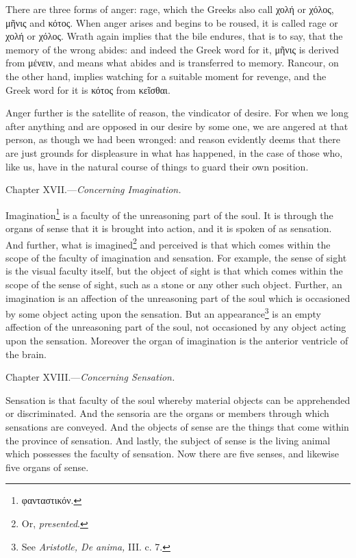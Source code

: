 There are three forms of anger: rage, which the Greeks also call \textgreek{χολή} or \textgreek{χόλος}, \textgreek{μῆνις} and \textgreek{κότος}. When anger arises and begins to be roused, it is called rage or \textgreek{χολή} or \textgreek{χόλος}. Wrath again implies that the bile endures, that is to say, that the memory of the wrong abides: and indeed the Greek word for it, \textgreek{μῆνις} is derived from \textgreek{μένειν}, and means what abides and is transferred to memory. Rancour, on the other hand, implies watching for a suitable moment for revenge, and the Greek word for it is \textgreek{κότος} from \textgreek{κεῖσθαι}.

Anger further is the satellite of reason, the vindicator of desire. For when we long after anything and are opposed in our desire by some one, we are angered at that person, as though we had been wronged: and reason evidently deems that there are just grounds for displeasure in what has happened, in the case of those who, like us, have in the natural course of things to guard their own position.


Chapter XVII.—\emph{Concerning Imagination.}

Imagination\footnote{\textgreek{φανταστικόν}.} is a faculty of the unreasoning part of the soul. It is through the organs of sense that it is brought into action, and it is spoken of as sensation. And further, what is imagined\footnote{Or, \emph{presented}.} and perceived is that which comes within the scope of the faculty of imagination and sensation. For example, the sense of sight is the visual faculty itself, but the object of sight is that which comes within the scope of the sense of sight, such as a stone or any other such object. Further, an imagination is an affection of the unreasoning part of the soul which is occasioned by some object acting upon the sensation. But an appearance\footnote{See \emph{Aristotle, De anima, }III. c. 7.} is an empty affection of the unreasoning part of the soul, not occasioned by any object acting upon the sensation. Moreover the organ of imagination is the anterior ventricle of the brain.


Chapter XVIII.—\emph{Concerning Sensation.}

Sensation is that faculty of the soul whereby material objects can be apprehended or discriminated. And the sensoria are the organs or members through which sensations are conveyed. And the objects of sense are the things that come within the province of sensation. And lastly, the subject of sense is the living animal which possesses the faculty of sensation. Now there are five senses, and likewise five organs of sense.

